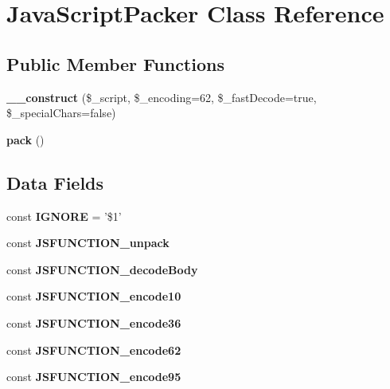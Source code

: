 \hypertarget{class_java_script_packer}{
\section{JavaScriptPacker Class Reference}
\label{class_java_script_packer}
}
\subsection*{Public Member Functions}
\begin{DoxyCompactItemize}
\item 
\hypertarget{class_java_script_packer_a6bfa79b4e9d184c3ffcc07ba969858af}{
{\bfseries \_\-\_\-construct} (\$\_\-script, \$\_\-encoding=62, \$\_\-fastDecode=true, \$\_\-specialChars=false)}
\label{class_java_script_packer_a6bfa79b4e9d184c3ffcc07ba969858af}

\item 
\hypertarget{class_java_script_packer_a8cca17dd818aa9ea539f8dd782435c4d}{
{\bfseries pack} ()}
\label{class_java_script_packer_a8cca17dd818aa9ea539f8dd782435c4d}

\end{DoxyCompactItemize}
\subsection*{Data Fields}
\begin{DoxyCompactItemize}
\item 
\hypertarget{class_java_script_packer_a39b21c631e47378e5a0d9c3e422d33cb}{
const {\bfseries IGNORE} = '\$1'}
\label{class_java_script_packer_a39b21c631e47378e5a0d9c3e422d33cb}

\item 
const {\bfseries JSFUNCTION\_\-unpack}
\item 
const {\bfseries JSFUNCTION\_\-decodeBody}
\item 
const {\bfseries JSFUNCTION\_\-encode10}
\item 
const {\bfseries JSFUNCTION\_\-encode36}
\item 
const {\bfseries JSFUNCTION\_\-encode62}
\item 
const {\bfseries JSFUNCTION\_\-encode95}
\end{DoxyCompactItemize}



